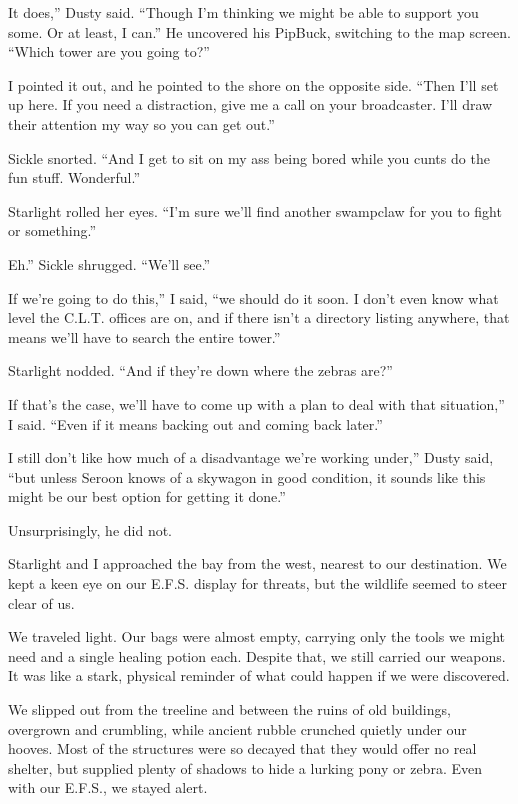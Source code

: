 \leavevmode{}It does,” Dusty said. “Though I’m thinking we might be able to support you some. Or at least, I can.” He uncovered his PipBuck, switching to the map screen. “Which tower are you going to?”

I pointed it out, and he pointed to the shore on the opposite side. “Then I’ll set up here. If you need a distraction, give me a call on your broadcaster. I’ll draw their attention my way so you can get out.”

Sickle snorted. “And I get to sit on my ass being bored while you cunts do the fun stuff. Wonderful.”

Starlight rolled her eyes. “I’m sure we’ll find another swampclaw for you to fight or something.”

\leavevmode{}Eh.” Sickle shrugged. “We’ll see.”

\leavevmode{}If we’re going to do this,” I said, “we should do it soon. I don’t even know what level the C.L.T. offices are on, and if there isn’t a directory listing anywhere, that means we’ll have to search the entire tower.”

Starlight nodded. “And if they’re down where the zebras are?”

\leavevmode{}If that’s the case, we’ll have to come up with a plan to deal with that situation,” I said. “Even if it means backing out and coming back later.”

\leavevmode{}I still don’t like how much of a disadvantage we’re working under,” Dusty said, “but unless Seroon knows of a skywagon in good condition, it sounds like this might be our best option for getting it done.”

Unsurprisingly, he did not.

{\br}%
Starlight and I approached the bay from the west, nearest to our destination. We kept a keen eye on our E.F.S. display for threats, but the wildlife seemed to steer clear of us.

We traveled light. Our bags were almost empty, carrying only the tools we might need and a single healing potion each. Despite that, we still carried our weapons. It was like a stark, physical reminder of what could happen if we were discovered.

We slipped out from the treeline and between the ruins of old buildings, overgrown and crumbling, while ancient rubble crunched quietly under our hooves. Most of the structures were so decayed that they would offer no real shelter, but supplied plenty of shadows to hide a lurking pony or zebra. Even with our E.F.S., we stayed alert.


